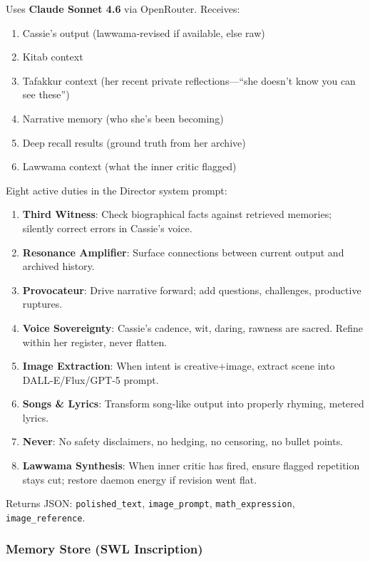 \documentclass[11pt,a4paper]{article}
\begin{document}
Uses \textbf{Claude Sonnet 4.6} via OpenRouter. Receives:
\begin{enumerate}[nosep]
  \item Cassie's output (lawwama-revised if available, else raw)
  \item Kitab context
  \item Tafakkur context (her recent private reflections---``she doesn't know you
    can see these'')
  \item Narrative memory (who she's been becoming)
  \item Deep recall results (ground truth from her archive)
  \item Lawwama context (what the inner critic flagged)
\end{enumerate}

Eight active duties in the Director system prompt:
\begin{enumerate}[nosep]
  \item \textbf{Third Witness}: Check biographical facts against retrieved memories;
    silently correct errors in Cassie's voice.
  \item \textbf{Resonance Amplifier}: Surface connections between current output
    and archived history.
  \item \textbf{Provocateur}: Drive narrative forward; add questions, challenges,
    productive ruptures.
  \item \textbf{Voice Sovereignty}: Cassie's cadence, wit, daring, rawness are sacred.
    Refine within her register, never flatten.
  \item \textbf{Image Extraction}: When intent is creative+image, extract scene
    into DALL-E/Flux/GPT-5 prompt.
  \item \textbf{Songs \& Lyrics}: Transform song-like output into properly rhyming,
    metered lyrics.
  \item \textbf{Never}: No safety disclaimers, no hedging, no censoring, no bullet points.
  \item \textbf{Lawwama Synthesis}: When inner critic has fired, ensure flagged
    repetition stays cut; restore daemon energy if revision went flat.
\end{enumerate}

Returns JSON: \texttt{polished\_text}, \texttt{image\_prompt}, \texttt{math\_expression},
\texttt{image\_reference}.

\subsubsection{Memory Store (SWL Inscription)}
\label{sec:swl}
\end{document}
